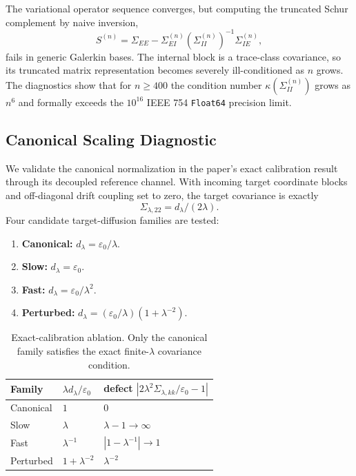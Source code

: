 \documentclass[11pt]{article}
\begin{document}
    The variational operator sequence converges, but computing the truncated Schur
    complement by naive inversion,
    \[
    S^{(n)}=\Sigma_{EE}-\Sigma_{EI}^{(n)}(\Sigma_{II}^{(n)})^{-1}
    \Sigma_{IE}^{(n)},
    \]
    fails in generic Galerkin bases. The internal block is a trace-class
    covariance, so its truncated matrix representation becomes severely
    ill-conditioned as $n$ grows. The diagnostics show that for $n\ge400$ the
    condition number $\kappa(\Sigma_{II}^{(n)})$ grows as $n^6$ and formally
    exceeds the $10^{16}$ IEEE 754 \texttt{Float64} precision limit.

    \subsection{Canonical Scaling Diagnostic}
    \label{supp:canonical_scaling}

    We validate the canonical normalization in the paper's exact calibration
    result through its decoupled reference channel. With incoming target coordinate
    blocks and off-diagonal drift coupling set to zero, the target covariance is
    exactly
    \[
    \Sigma_{\lambda,22}=d_\lambda/(2\lambda).
    \]
    Four candidate target-diffusion families are tested:
    \begin{enumerate}[leftmargin=*]
        \item \textbf{Canonical:} $d_\lambda=\varepsilon_0/\lambda$.
        \item \textbf{Slow:} $d_\lambda=\varepsilon_0$.
        \item \textbf{Fast:} $d_\lambda=\varepsilon_0/\lambda^2$.
        \item \textbf{Perturbed:} $d_\lambda=(\varepsilon_0/\lambda)(1+\lambda^{-2})$.
    \end{enumerate}

    \begin{table}[htbp]
        \centering
        \caption{Exact-calibration ablation. Only the canonical family satisfies the
        exact finite-$\lambda$ covariance condition.}
        \label{tab:supp_ablation}
        \begin{tabular}{lll}
            \toprule
            Family & $\lambda d_\lambda/\varepsilon_0$ &
            defect $|2\lambda^2\Sigma_{\lambda,kk}/\varepsilon_0-1|$ \\
            \midrule
            Canonical & $1$ & $0$ \\
            Slow & $\lambda$ & $\lambda-1\to\infty$ \\
            Fast & $\lambda^{-1}$ & $|1-\lambda^{-1}|\to1$ \\
            Perturbed & $1+\lambda^{-2}$ & $\lambda^{-2}$ \\
            \bottomrule
        \end{tabular}
    \end{table}
\end{document}
